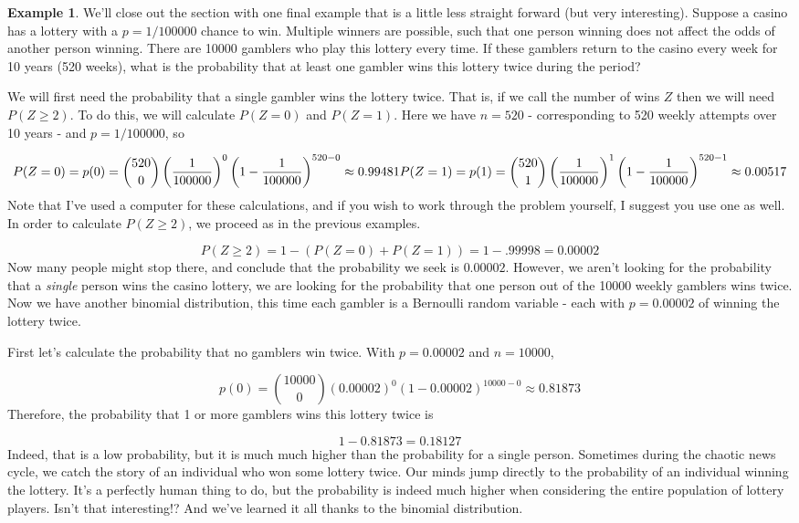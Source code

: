 \documentclass[
]{book}
\theoremstyle{definition}
\theoremstyle{definition}
\newtheorem{example}{Example}[chapter]
\theoremstyle{definition}
\theoremstyle{definition}
\theoremstyle{remark}
\begin{document}
\begin{example}
We'll close out the section with one final example that is a little less straight forward (but very interesting). Suppose a casino has a lottery with a \(p = 1/100000\) chance to win. Multiple winners are possible, such that one person winning does not affect the odds of another person winning. There are 10000 gamblers who play this lottery every time. If these gamblers return to the casino every week for 10 years (520 weeks), what is the probability that at least one gambler wins this lottery twice during the period?

We will first need the probability that a single gambler wins the lottery twice. That is, if we call the number of wins \(Z\) then we will need \(P(Z \geq 2)\). To do this, we will calculate \(P(Z=0)\) and \(P(Z=1)\). Here we have \(n = 520\) - corresponding to 520 weekly attempts over 10 years - and \(p = 1/100000\), so

\[
P(Z=0) = p(0) = {520 \choose 0} \left(\frac{1}{100000}\right)^0\left(1-\frac{1}{100000}\right)^{520-0} \approx 0.99481\\
P(Z=1) = p(1) = {520 \choose 1} \left(\frac{1}{100000}\right)^1\left(1-\frac{1}{100000}\right)^{520-1} \approx 0.00517
\]
Note that I've used a computer for these calculations, and if you wish to work through the problem yourself, I suggest you use one as well. In order to calculate \(P(Z \geq 2)\), we proceed as in the previous examples.

\[
P(Z \geq 2) = 1 - (P(Z = 0) + P(Z=1)) = 1 - .99998 = 0.00002
\]
Now many people might stop there, and conclude that the probability we seek is \(0.00002\). However, we aren't looking for the probability that a \emph{single} person wins the casino lottery, we are looking for the probability that one person out of the 10000 weekly gamblers wins twice. Now we have another binomial distribution, this time each gambler is a Bernoulli random variable - each with \(p = 0.00002\) of winning the lottery twice.

First let's calculate the probability that no gamblers win twice. With \(p = 0.00002\) and \(n = 10000\),

\[
p(0) = {10000 \choose 0} (0.00002)^0(1-0.00002)^{10000-0} \approx 0.81873
\]
Therefore, the probability that 1 or more gamblers wins this lottery twice is

\[
1 - 0.81873 = 0.18127
\]
Indeed, that is a low probability, but it is much much higher than the probability for a single person. Sometimes during the chaotic news cycle, we catch the story of an individual who won some lottery twice. Our minds jump directly to the probability of an individual winning the lottery. It's a perfectly human thing to do, but the probability is indeed much higher when considering the entire population of lottery players. Isn't that interesting!? And we've learned it all thanks to the binomial distribution.
\end{example}
\end{document}
